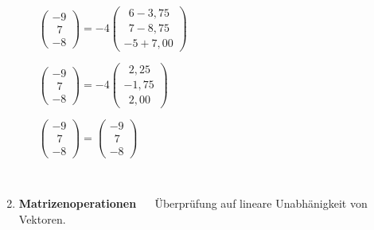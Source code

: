 \documentclass[10pt,ngerman]{scrartcl}
\begin{document}
\begin{enumerate}[1.]
\begin{enumerate}[(a)]
	\begin{math}\begin{pmatrix}-9 \\ ~~7 \\ -8\end{pmatrix} = - 4 \begin{pmatrix}~~6-3,75 \\ ~~7-8,75 \\ -5+7,00\end{pmatrix}\end{math}\newline
	
	\begin{math}\begin{pmatrix}-9 \\ ~~7 \\ -8\end{pmatrix} = - 4 \begin{pmatrix}~~2,25 \\ -1,75 \\ ~~2,00\end{pmatrix}\end{math}\newline
	
	\begin{math}\begin{pmatrix}-9 \\ ~~7 \\ -8\end{pmatrix} = \begin{pmatrix}-9 \\ ~~7 \\ -8\end{pmatrix}\end{math}\newline
	
	\end{enumerate}
	
	~\newline~	
	
	
\item \textbf{Matrizenoperationen}
	    ~\newline~\newline
	    Überprüfung auf lineare Unabhänigkeit von Vektoren.
	    ~\newline~
	    

\end{enumerate}
\end{document}
